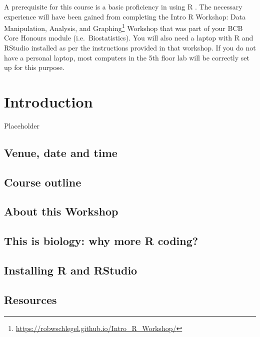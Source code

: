 \documentclass[english,10pt,a4paper,oneside]{book}
\renewcommand{\href}[2]{#2\footnote{\url{#1}}}
\let\rmarkdownfootnote\footnote%
\def\footnote{\protect\rmarkdownfootnote}
\begin{document}
A prerequisite for this course is a basic proficiency in using R \citep{R2017}. The necessary experience will have been gained from completing the \href{https://robwschlegel.github.io/Intro_R_Workshop/}{Intro R Workshop: Data Manipulation, Analysis, and Graphing} Workshop that was part of your BCB Core Honours module (i.e.~Biostatistics). You will also need a laptop with R and RStudio installed as per the instructions provided in that workshop. If you do not have a personal laptop, most computers in the 5th floor lab will be correctly set up for this purpose.

\hypertarget{introduction}{%
\chapter{Introduction}\label{introduction}}

Placeholder

\hypertarget{venue-date-and-time}{%
\section{Venue, date and time}\label{venue-date-and-time}}

\hypertarget{course-outline}{%
\section{Course outline}\label{course-outline}}

\hypertarget{about-this-workshop}{%
\section{About this Workshop}\label{about-this-workshop}}

\hypertarget{this-is-biology-why-more-r-coding}{%
\section{This is biology: why more R coding?}\label{this-is-biology-why-more-r-coding}}

\hypertarget{installing-r-and-rstudio}{%
\section{Installing R and RStudio}\label{installing-r-and-rstudio}}

\hypertarget{resources}{%
\section{Resources}\label{resources}}
\end{document}
